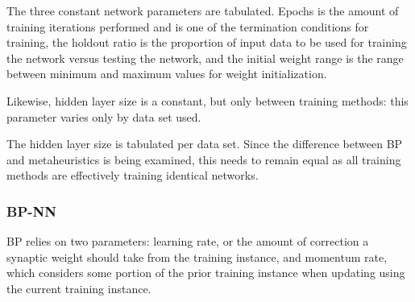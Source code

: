 \documentclass[a4paper,12pt]{article}
\begin{document}
\begin{table}[h!]
\centering
{}
\caption{Constant network parameters.}
\label{Tab:const-par}
\end{table}

The three constant network parameters are tabulated. Epochs is the amount of training iterations performed and is one of the termination conditions for training, the holdout ratio is the proportion of input data to be used for training the network versus testing the network, and the initial weight range is the range between minimum and maximum values for weight initialization.

Likewise, hidden layer size is a constant, but only between training methods: this parameter varies only by data set used.

\begin{table}[h!]
\centering
{}
\caption{Hidden layer size per data set.}
\label{Tab:hl-tab}
\end{table}

The hidden layer size is tabulated per data set. Since the difference between BP and metaheuristics is being examined, this needs to remain equal as all training methods are effectively training identical networks.

\pagebreak

\subsubsection{BP-NN}

BP relies on two parameters: learning rate, or the amount of correction a synaptic weight should take from the training instance, and momentum rate, which considers some portion of the prior training instance when updating using the current training instance.
\end{document}
